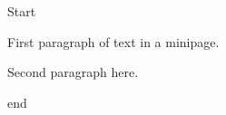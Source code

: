 \documentclass[12pt]{article}
\begin{document}
Start \begin{minipage}[b]{5cm}\centering First paragraph of text in a minipage.

Second paragraph here.\end{minipage} end
\end{document}
